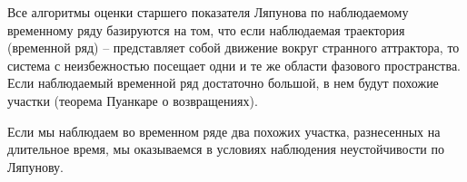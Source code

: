 \documentclass[11pt]{article}
\begin{document}
	Все алгоритмы оценки старшего показателя Ляпунова по наблюдаемому временному ряду базируются на том, что если наблюдаемая траектория (временной ряд) -- представляет собой движение вокруг странного аттрактора, то система с неизбежностью посещает одни и те же области фазового пространства. Если наблюдаемый временной ряд достаточно большой, в нем будут похожие участки (теорема Пуанкаре о возвращениях).
	
	Если мы наблюдаем во временном ряде два похожих участка, разнесенных на длительное время, мы оказываемся в условиях наблюдения неустойчивости по Ляпунову.
	
	
	
	
	
	
	
	
	
\end{document}
